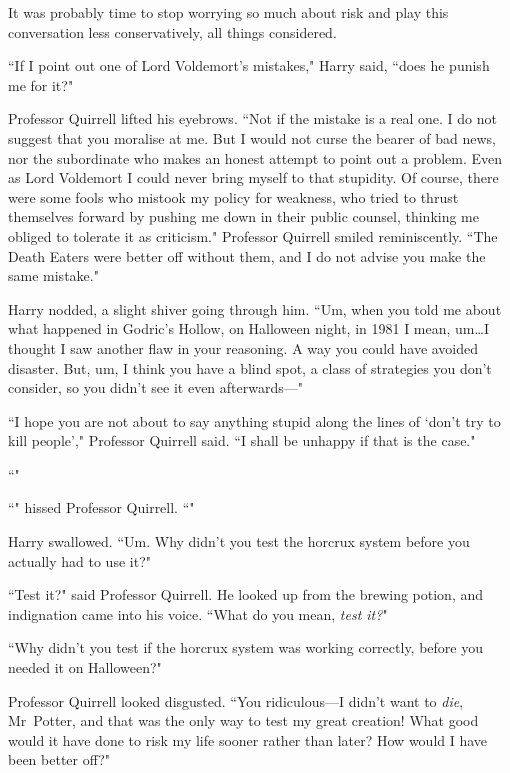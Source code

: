 It was probably time to stop worrying so much about risk and play this conversation less conservatively, all things considered.

``If I point out one of Lord Voldemort's mistakes," Harry said, ``does he punish me for it?"

Professor Quirrell lifted his eyebrows. ``Not if the mistake is a real one. I do not suggest that you moralise at me. But I would not curse the bearer of bad news, nor the subordinate who makes an honest attempt to point out a problem. Even as Lord Voldemort I could never bring myself to that stupidity. Of course, there were some fools who mistook my policy for weakness, who tried to thrust themselves forward by pushing me down in their public counsel, thinking me obliged to tolerate it as criticism." Professor Quirrell smiled reminiscently. ``The Death Eaters were better off without them, and I do not advise you make the same mistake."

Harry nodded, a slight shiver going through him. ``Um, when you told me about what happened in Godric's Hollow, on Halloween night, in 1981 I mean, um…I thought I saw another flaw in your reasoning. A way you could have avoided disaster. But, um, I think you have a blind spot, a class of strategies you don't consider, so you didn't see it even afterwards—"

``I hope you are not about to say anything stupid along the lines of `don't try to kill people'," Professor Quirrell said. ``I shall be unhappy if that is the case."

``"

``" hissed Professor Quirrell. ``"

Harry swallowed. ``Um. Why didn't you test the horcrux system before you actually had to use it?"

``Test it?" said Professor Quirrell. He looked up from the brewing potion, and indignation came into his voice. ``What do you mean, \emph{test it?}"

``Why didn't you test if the horcrux system was working correctly, before you needed it on Halloween?"

Professor Quirrell looked disgusted. ``You ridiculous—I didn't want to \emph{die}, Mr~Potter, and that was the only way to test my great creation! What good would it have done to risk my life sooner rather than later? How would I have been better off?"

